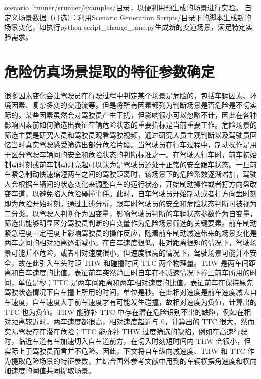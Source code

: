 scenario\_runner/srunner/examples/目录，以便利用预生成的场景进行实验。
自定义场景数据（可选）：利用Scenario Generation Scripts/目录下的脚本生成新的场景变化，如执行python script\_change\_lane.py生成新的变道场景，满足特定实验需求。

\section{危险仿真场景提取的特征参数确定}

很多因素变化会让驾驶员在行驶过程中判定某个场景是危险的，包括车辆因素、环境因素、复杂多变的交通流等。但是将所有因素都列为判断场景是否危险是不切实际的。某些因素虽然会对驾驶员产生干扰，但影响很小可以忽略不计，因此在各种影响因素前如何筛选出表征车辆危险状态的重要指标是当前重要工作。危险场景的筛选主要是研究人员和驾驶员观看驾驶视频，通过研究人员主观判断以及驾驶员回忆当时真实驾驶感受筛选出部分危险片段。当驾驶员在行车过程中，制动操作是用于区分驾驶车辆间的安全和危险状态的判断标准之一。在驾驶人行车时，前车初始制动时刻或前车制动灯亮起可以认为是驾驶员还处于正常的安全跟车状态。一旦前车紧急制动快速缩短两车之间的驾驶距离时，该场景下的危险系数逐渐增加，驾驶人会根据车辆间的状态变化来调整自车的运行状态，开始制动操作或者打方向盘改变车道，以避免陷入危险碰撞事件。此时，自车驾驶员开始制动或者打方向盘时刻即为危险开始时刻。通过上述分析，跟车时驾驶员的安全和危险状态判断可被视为二分类。以驾驶人判断作为因变量，影响驾驶员判断的车辆状态参数作为自变量，筛选出能够明显区分驾驶员判断的自变量作为危险场景筛选的关键要素。前车制动紧急程度一定程度上影响驾驶员的操作反应，随着前车制动减速带来的场景变化是两车之间的相对距离逐渐减小。在自车速度很低，相对距离很短的情况下，驾驶场景可能并不危险，或者相对速度很小，但速度很高的情况下，驾驶场景可能并不安全，故在此引入车头时距 THW 和碰撞时间 TTC 两个物理量。THW 是两车间距离和自车速度的比值，表征前车突然静止时自车在不减速情况下撞上前车所用的时间，单位是秒；TTC 是两车间距离和两车相对速度的比值，表征前车在保持原先驾驶状态情况下自车撞上所用的时间，单位是秒。在此相对速度是前车速度减去自车速度，自车速度大于前车速度才有可能发生碰撞，故相对速度为负值，计算出的 TTC 也为负值。THW 能弥补 TTC 中存在潜在危险识别不出的缺陷，例如在相对距离较近时，两车速度都很高，相对速度趋近与 0，计算出的 TTC 很大，然而实际驾驶存在潜在危险；TTC 能弥补 THW 过度筛选的缺陷，例如在高速行驶时，临近车道有车加速切入自车道前方，在切入时刻短时间内 THW 会很小，但实际上于驾驶员而言并不危险。因此，下文将自车纵向减速度、THW 和 TTC 作为提取危险场景的特征参数，并结合国外参考文献中用到的车辆横摆角速度和横向加速度的阈值共同提取场景\cite{杨敏明2017基于自然驾驶实验的驾驶行为研究}。

